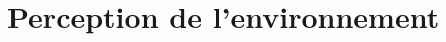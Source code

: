 \documentclass[11pt, a4paper]{book}
\begin{document}
\sloppy

\setcounter{tocdepth}{3}

\dominitoc%
\tableofcontents

\setcounter{chapter}{1}

\chapter{Perception de l'environnement}




\end{document}

